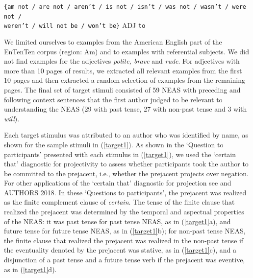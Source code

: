 \documentclass[11pt,fleqn]{article}
\newcommand{\6}{\mbox{$[\hspace*{-.6mm}[$}}
\newcommand{\9}{\mbox{$]\hspace*{-.6mm}]$}}
\begin{document}
\begin{exe}
\ex\label{string} {\tt \{am not / are not / aren't / is not / isn't / was not / wasn't / were not / \\ weren't / will not be / won't be\}} ADJ {\tt to}
\end{exe}
We limited ourselves to examples from the American English part of the EnTenTen corpus (region: Am) and to examples with referential subjects. We did not find examples for the adjectives {\em polite, brave} and {\em rude}. For adjectives with more than 10 pages of results, we extracted all relevant examples from the first 10 pages and then extracted a random selection of examples from the remaining pages. The final set of target stimuli consisted of 59 NEAS with preceding and following context sentences that the first author judged to be relevant to understanding the NEAS (29 with past tense, 27 with non-past tense and 3 with {\em will}).

Each target stimulus was attributed to an author who was identified by name, as shown for the sample stimuli in (\ref{target1}). As shown in the `Question to participants' presented with each stimulus in (\ref{target1}), we used the `certain that' diagnostic for projectivity to assess whether participants took the author to be committed to the prejacent, i.e., whether the prejacent projects over negation. For other applications of the `certain that' diagnostic for projection see \citealt{tonhauser-salt26,djaerv-bacovcin-salt27,stevens-etal2017} and AUTHORS 2018. In these `Questions to participants', the prejacent was realized as the finite complement clause of {\em certain}. The tense of the finite clause that realized the prejacent was determined by the temporal and aspectual properties of the
NEAS: it was past tense for past tense NEAS, as in (\ref{target1}a), and future tense for future tense NEAS, as in (\ref{target1}b); for non-past tense NEAS, the finite clause that realized the prejacent was realized in the non-past tense if the eventuality denoted by the prejacent was
stative, as in (\ref{target1}c), and a disjunction of a past tense and a future tense verb if the prejacent was eventive, as in (\ref{target1}d).
\end{document}

